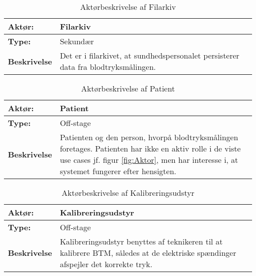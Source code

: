 \begin{table}[H]
\begin{center}
\begin{tabular} {| p{6cm} | p{9cm} |}
\hline
\textbf{Aktør:} & Filarkiv \\ \hline
\textbf{Type:} & Sekundær \\ \hline
\textbf{Beskrivelse} & 
Det er i filarkivet, at sundhedspersonalet persisterer data fra blodtryksmålingen.
 \\ \hline
\end{tabular}
\end{center}
\caption{Aktørbeskrivelse af Filarkiv}
\label{tb:AktorbeskrivelseFA}
\end{table}



\begin{table}[H]
\begin{center}
\begin{tabular} {| p{6cm} | p{9cm} |}
\hline
\textbf{Aktør:} & Patient \\ \hline
\textbf{Type:} & Off-stage \\ \hline
\textbf{Beskrivelse} & 
Patienten og den person, hvorpå blodtryksmålingen foretages. Patienten har ikke en aktiv rolle i de viste use cases jf. figur \ref{fig:Aktor}, men har interesse i, at systemet fungerer efter hensigten.
 \\ \hline
\end{tabular}
\end{center}
\caption{Aktørbeskrivelse af Patient}
\label{tb:AktorbeskrivelsePA}
\end{table}


\begin{table}[H]
\begin{center}
\begin{tabular} {| p{6cm} | p{9cm} |}
\hline
\textbf{Aktør:} & Kalibreringsudstyr \\ \hline
\textbf{Type:} & Off-stage \\ \hline
\textbf{Beskrivelse} & 
Kalibreringsudstyr benyttes af teknikeren til at kalibrere BTM, således at de elektriske spændinger afspejler det korrekte tryk.
 \\ \hline
\end{tabular}
\end{center}
\caption{Aktørbeskrivelse af Kalibreringsudstyr}
\label{tb:AktorbeskrivelsePA}
\end{table}